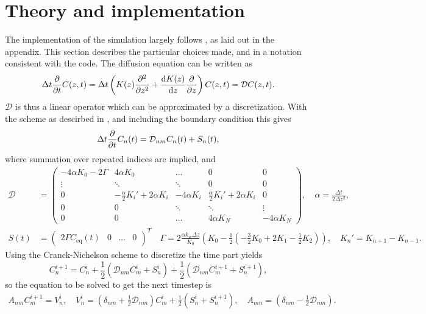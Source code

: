 \documentclass{article}
\begin{document}
    \section*{Theory and implementation}
    The implementation of the simulation largely follows \cite{exercise}, as laid out in the appendix. This section describes the particular choices made, and in a notation consistent with the code. The diffusion equation can be written as
    \begin{equation*}
        \Delta t \pdv{t} C(z, t) = \Delta t \left(K(z) \pdv[2]{z} + \dv{K(z)}{z}\pdv{z}\right) C(z, t) = \mathcal{D} C(z, t).
    \end{equation*}
    $\mathcal{D}$ is thus a linear operator which can be approximated by a discretization. With the scheme as descirbed in \cite{exercise}, and including the boundary condition this gives   
    \begin{equation*}
        \Delta t \pdv{t} C_n(t) = \mathcal{D}_{nm} C_n(t) + S_n(t),
    \end{equation*}
    where summation over repeated indices are implied, and
    \begin{align*}
        \mathcal{D} &=
        \begin{pmatrix}
            -4\alpha K_0 - 2\Gamma & 4\alpha K_0 & \dots & 0 & 0 \\
            \vdots & \ddots & \ddots & 0 & 0\\
            0 & -\frac{\alpha}{2} K_i' + 2\alpha K_i & -4 \alpha K_i & \frac{\alpha}{2}K_i' + 2\alpha K_i & 0 \\
            0 & 0 & \ddots & \ddots & \vdots\\
            0 & 0 & \dots & 4\alpha K_N & -4\alpha K_N
        \end{pmatrix}, \quad \alpha = \frac{\Delta t}{2 \Delta z^2 },\\
        S(t) & =  
        \begin{pmatrix}
            2\Gamma C_\mathrm{eq}(t) &0&\dots&0
        \end{pmatrix}^T \quad 
    \Gamma = 2 \frac{\alpha k_w \Delta z}{K_0} \left(K_0 - \frac{1}{2}(-\frac{3}{2} K_0 + 2K_1 - \frac{1}{2}K_2)\right), \quad
      K_n' = K_{n+1} - K_{n-1}.
    \end{align*}
    Using the Cranck-Nichelson scheme to discretize the time part yields
    \begin{equation*}
        C_n^{i+1}  = C_n^i + \frac{1}{2} (\mathcal{D}_{nm} C_m^i + S_n^i) + \frac{1}{2} (\mathcal{D}_{nm} C_m^{i+1} + S_n^{i+1}),
    \end{equation*}
    so the equation to be solved to get the next timestep is
    \begin{align*}
        A_{nm} C_{m}^{i+1} = V_n^i, \quad V_n^i = \left(\delta_{nm} + \frac{1}{2} \mathcal{D}_{nm}\right) C_m^i + \frac{1}{2}(S_n^i + S_n^{i+1}), \quad 
        A_{mn} = \left(\delta_{nm} - \frac{1}{2} \mathcal{D}_{nm}\right).
    \end{align*}
    
\end{document}
